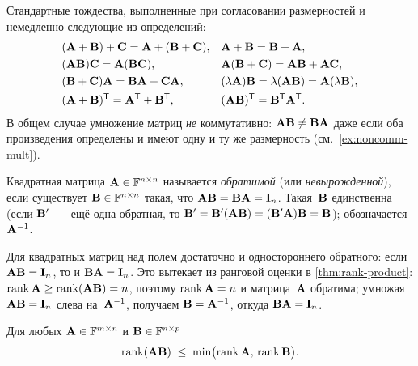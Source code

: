 \begin{remark}
\label{rem:matrix-op-laws}
Стандартные тождества, выполненные при согласовании размерностей и
немедленно следующие из определений:
\begin{align*}
  &(\mathbf{A} + \mathbf{B}) + \mathbf{C} = \mathbf{A} + (\mathbf{B} + \mathbf{C}),
  & &\mathbf{A} + \mathbf{B} = \mathbf{B} + \mathbf{A}, \\
  &(\mathbf{A}\mathbf{B})\mathbf{C} = \mathbf{A}(\mathbf{B}\mathbf{C}),
  & &\mathbf{A}(\mathbf{B} + \mathbf{C}) = \mathbf{A}\mathbf{B} + \mathbf{A}\mathbf{C}, \\
  &(\mathbf{B} + \mathbf{C})\mathbf{A} = \mathbf{B}\mathbf{A} + \mathbf{C}\mathbf{A},
  & &(\lambda \mathbf{A})\mathbf{B} = \lambda(\mathbf{A}\mathbf{B}) = \mathbf{A}(\lambda \mathbf{B}), \\
  &(\mathbf{A} + \mathbf{B})^{\mathsf{T}} = \mathbf{A}^{\mathsf{T}} + \mathbf{B}^{\mathsf{T}},
  & &(\mathbf{A}\mathbf{B})^{\mathsf{T}} = \mathbf{B}^{\mathsf{T}} \mathbf{A}^{\mathsf{T}}.
\end{align*}
В общем случае умножение матриц \emph{не} коммутативно:
$\mathbf{A}\mathbf{B} \neq \mathbf{B}\mathbf{A}$ даже если оба произведения
определены и имеют одну и ту же размерность (см.~\cref{ex:noncomm-mult}).
\end{remark}

\begin{definition}
\label{def:invertible}
Квадратная матрица $\mathbf{A} \in \mathbb{F}^{n \times n}$ называется
\emph{обратимой} (или \emph{невырожденной}), если существует
$\mathbf{B} \in \mathbb{F}^{n \times n}$ такая, что
$\mathbf{A}\mathbf{B} = \mathbf{B}\mathbf{A} = \mathbf{I}_n$. Такая~$\mathbf{B}$
единственна (если $\mathbf{B}'$~--- ещё одна обратная, то
$\mathbf{B}' = \mathbf{B}'(\mathbf{A}\mathbf{B}) = (\mathbf{B}'\mathbf{A})\mathbf{B} = \mathbf{B}$);
обозначается $\mathbf{A}^{-1}$.
\end{definition}

\begin{remark}
Для квадратных матриц над полем достаточно и одностороннего обратного:
если $\mathbf{A}\mathbf{B} = \mathbf{I}_n$, то и $\mathbf{B}\mathbf{A} = \mathbf{I}_n$.
Это вытекает из ранговой оценки в \cref{thm:rank-product}:
$\operatorname{rank} \mathbf{A} \ge \operatorname{rank}(\mathbf{A}\mathbf{B}) = n$, поэтому
$\operatorname{rank} \mathbf{A} = n$ и матрица~$\mathbf{A}$ обратима; умножая
$\mathbf{A}\mathbf{B} = \mathbf{I}_n$ слева на~$\mathbf{A}^{-1}$, получаем
$\mathbf{B} = \mathbf{A}^{-1}$, откуда $\mathbf{B}\mathbf{A} = \mathbf{I}_n$.
\end{remark}

\begin{theorem}
\label{thm:rank-product}
Для любых $\mathbf{A} \in \mathbb{F}^{m \times n}$ и $\mathbf{B} \in \mathbb{F}^{n \times p}$
\[
  \operatorname{rank}(\mathbf{A}\mathbf{B}) \;\le\; \min\bigl(\operatorname{rank} \mathbf{A},\, \operatorname{rank} \mathbf{B}\bigr).
\]
\end{theorem}

